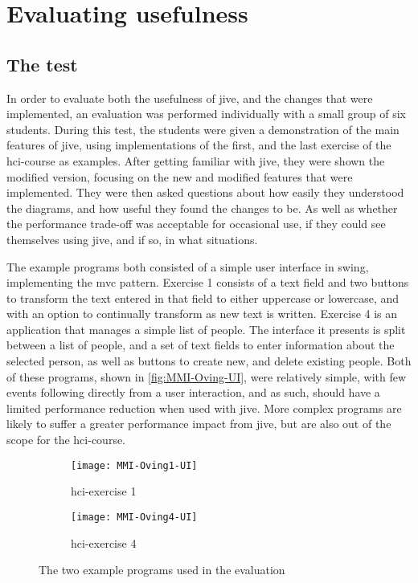 \chapter{Evaluating usefulness}\label{jiveEval}
\section{The test}\label{jiveEvalTest}
In order to evaluate both the usefulness of \gls{jive}, and the changes that were implemented, an evaluation was performed individually with a small group of six students.
During this test, the students were given a demonstration of the main features of \gls{jive}, using implementations of the first, and the last exercise of the \gls{hci}-course as examples.
After getting familiar with \gls{jive}, they were shown the modified version, focusing on the new and modified features that were implemented.
They were then asked questions about how easily they understood the diagrams, and how useful they found the changes to be.
As well as whether the performance trade-off was acceptable for occasional use, if they could see themselves using \gls{jive}, and if so, in what situations.

The example programs both consisted of a simple user interface in swing, implementing the \gls{mvc} pattern.
Exercise 1 consists of a text field and two buttons to transform the text entered in that field to either uppercase or lowercase, and with an option to continually transform as new text is written.
Exercise 4 is an application that manages a simple list of people.
The interface it presents is split between a list of people, and a set of text fields to enter information about the selected person, as well as buttons to create new, and delete existing people.
Both of these programs, shown in \autoref{fig:MMI-Oving-UI}, were relatively simple, with few events following directly from a user interaction, and as such, should have a limited performance reduction when used with \gls{jive}.
More complex programs are likely to suffer a greater performance impact from \gls{jive}, but are also out of the scope for the \gls{hci}-course.


\begin{figure}[H]
	\centering
	\begin{subfigure}{\textwidth}
		\centering
		\texttt{[image: MMI-Oving1-UI]}
		\caption{\gls{hci}-exercise 1}
		\label{fig:MMI-Oving1-UI}
	\end{subfigure}
	\begin{subfigure}{\textwidth}
		\centering
		\texttt{[image: MMI-Oving4-UI]}
		\caption{\gls{hci}-exercise 4}
		\label{fig:MMI-Oving4-UI}
	\end{subfigure}
	\caption{The two example programs used in the evaluation}
	\label{fig:MMI-Oving-UI}
\end{figure}

